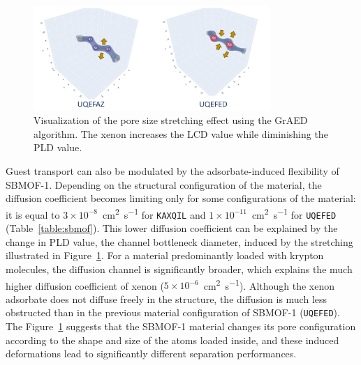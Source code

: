 \documentclass[main]{subfiles}
\begin{document}
\begin{figure}[ht]
  \centering
  \includegraphics[width=0.8\textwidth]{figures/6-perspectives/KAXQIL_stretch.pdf}
  \caption{ Visualization of the pore size stretching effect using the GrAED algorithm. The xenon increases the LCD value while diminishing the PLD value. }\label{fgr:stretch}
\end{figure}

Guest transport can also be modulated by the adsorbate-induced flexibility of SBMOF-1. Depending on the structural configuration of the material, the diffusion coefficient becomes limiting only for some configurations of the material: it is equal to $3\times10^{-8}$~\si{\square\cm\per\s} for \texttt{KAXQIL} and $1\times10^{-11}$~\si{\square\cm\per\s} for \texttt{UQEFED} (Table~\ref{table:sbmof}). This lower diffusion coefficient can be explained by the change in PLD value, the channel bottleneck diameter, induced by the stretching illustrated in Figure~\ref{fgr:stretch}. For a material predominantly loaded with krypton molecules, the diffusion channel is significantly broader, which explains the much higher diffusion coefficient of xenon ($5\times10^{-6}$~\si{\square\cm\per\s}). Although the xenon adsorbate does not diffuse freely in the structure, the diffusion is much less obstructed than in the previous material configuration of SBMOF-1 (\texttt{UQEFED}). The Figure~\ref{fgr:stretch} suggests that the SBMOF-1 material changes its pore configuration according to the shape and size of the atoms loaded inside, and these induced deformations lead to significantly different separation performances.
\end{document}
